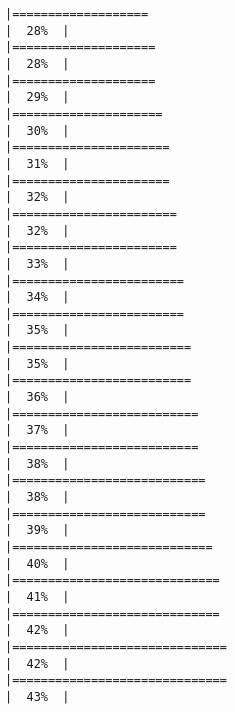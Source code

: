 \documentclass[
]{book}
\begin{document}
\begin{verbatim}
|===================                                                   |  28%  |                                                                              |====================                                                  |  28%  |                                                                              |====================                                                  |  29%  |                                                                              |=====================                                                 |  30%  |                                                                              |======================                                                |  31%  |                                                                              |======================                                                |  32%  |                                                                              |=======================                                               |  32%  |                                                                              |=======================                                               |  33%  |                                                                              |========================                                              |  34%  |                                                                              |========================                                              |  35%  |                                                                              |=========================                                             |  35%  |                                                                              |=========================                                             |  36%  |                                                                              |==========================                                            |  37%  |                                                                              |==========================                                            |  38%  |                                                                              |===========================                                           |  38%  |                                                                              |===========================                                           |  39%  |                                                                              |============================                                          |  40%  |                                                                              |=============================                                         |  41%  |                                                                              |=============================                                         |  42%  |                                                                              |==============================                                        |  42%  |                                                                              |==============================                                        |  43%  |                                                                              
\end{verbatim}
\end{document}
